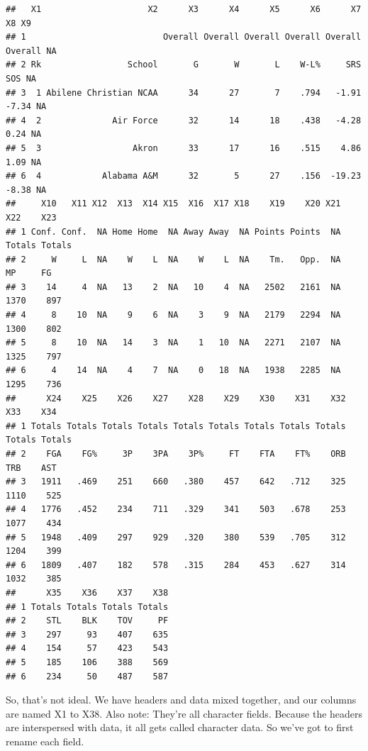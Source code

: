 \documentclass[
]{book}
\begin{document}
\begin{verbatim}
##   X1                     X2      X3      X4      X5      X6      X7      X8 X9
## 1                           Overall Overall Overall Overall Overall Overall NA
## 2 Rk                 School       G       W       L    W-L%     SRS     SOS NA
## 3  1 Abilene Christian NCAA      34      27       7    .794   -1.91   -7.34 NA
## 4  2              Air Force      32      14      18    .438   -4.28    0.24 NA
## 5  3                  Akron      33      17      16    .515    4.86    1.09 NA
## 6  4            Alabama A&M      32       5      27    .156  -19.23   -8.38 NA
##     X10   X11 X12  X13  X14 X15  X16  X17 X18    X19    X20 X21    X22    X23
## 1 Conf. Conf.  NA Home Home  NA Away Away  NA Points Points  NA Totals Totals
## 2     W     L  NA    W    L  NA    W    L  NA    Tm.   Opp.  NA     MP     FG
## 3    14     4  NA   13    2  NA   10    4  NA   2502   2161  NA   1370    897
## 4     8    10  NA    9    6  NA    3    9  NA   2179   2294  NA   1300    802
## 5     8    10  NA   14    3  NA    1   10  NA   2271   2107  NA   1325    797
## 6     4    14  NA    4    7  NA    0   18  NA   1938   2285  NA   1295    736
##      X24    X25    X26    X27    X28    X29    X30    X31    X32    X33    X34
## 1 Totals Totals Totals Totals Totals Totals Totals Totals Totals Totals Totals
## 2    FGA    FG%     3P    3PA    3P%     FT    FTA    FT%    ORB    TRB    AST
## 3   1911   .469    251    660   .380    457    642   .712    325   1110    525
## 4   1776   .452    234    711   .329    341    503   .678    253   1077    434
## 5   1948   .409    297    929   .320    380    539   .705    312   1204    399
## 6   1809   .407    182    578   .315    284    453   .627    314   1032    385
##      X35    X36    X37    X38
## 1 Totals Totals Totals Totals
## 2    STL    BLK    TOV     PF
## 3    297     93    407    635
## 4    154     57    423    543
## 5    185    106    388    569
## 6    234     50    487    587
\end{verbatim}

So, that's not ideal. We have headers and data mixed together, and our columns are named X1 to X38. Also note: They're all character fields. Because the headers are interspersed with data, it all gets called character data. So we've got to first rename each field.
\end{document}
